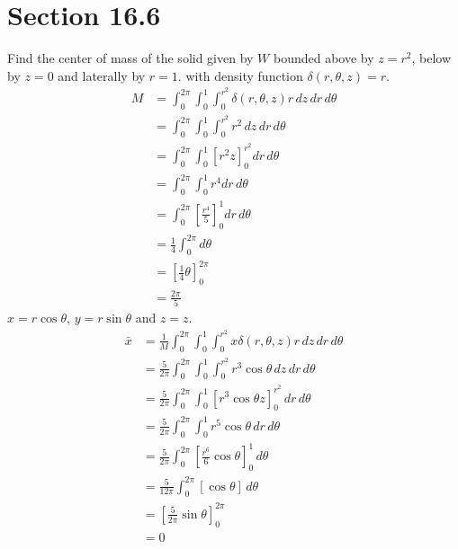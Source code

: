 \documentclass[letter,11pt]{article}
\begin{document}
\section*{Section 16.6}
Find the center of mass of the solid given by $W$ bounded above by $z = r^2$, below by $z = 0$ and laterally by $r = 1$. with density function $\delta(r, \theta, z) = r$.
\begin{align*}
    M&= \int_{0}^{2\pi}\int_{0}^{1}\int_{0}^{r^{2}}\delta(r, \theta, z) r \, dz\, dr\, d\theta\\
    &= \int_{0}^{2\pi}\int_{0}^{1}\int_{0}^{r^{2}} r^2 \, dz\, dr\, d\theta\\
    &= \int_{0}^{2\pi}\int_{0}^{1} \left[r^2z\right]_{0}^{r^2}dr\, d\theta \\
    &= \int_{0}^{2\pi}\int_{0}^{1} r^4 dr\, d\theta \\
    &= \int_{0}^{2\pi}\left[\frac{r^4}{5}\right]_{0}^{1} dr\, d\theta \\
    &= \frac{1}{4}\int_{0}^{2\pi}d\theta \\
    &= \left[\frac{1}{4}\theta\right]_{0}^{2\pi} \\
    &= \frac{2\pi}{5}
\end{align*}
$x=r\cos\theta$, $y=r\sin\theta$ and $z=z$.
\begin{align*}
\bar{x} &= \frac{1}{M}\int_{0}^{2\pi}\int_{0}^{1}\int_{0}^{r^{2}} x\delta(r, \theta, z) r \, dz\, dr\, d\theta \\
        &= \frac{5}{2\pi}\int_{0}^{2\pi}\int_{0}^{1}\int_{0}^{r^{2}} r^3\cos\theta \, dz\, dr\, d\theta \\
        &= \frac{5}{2\pi}\int_{0}^{2\pi}\int_{0}^{1} \left[r^3\cos\theta z\right]_{0}^{r^{2}} \, dr\, d\theta \\
        &= \frac{5}{2\pi}\int_{0}^{2\pi}\int_{0}^{1} r^5\cos\theta \, dr\, d\theta \\
        &= \frac{5}{2\pi}\int_{0}^{2\pi} \left[\frac{r^6}{6}\cos\theta \right]_{0}^{1}\, d\theta \\
        &= \frac{5}{12\pi}\int_{0}^{2\pi} \left[\cos\theta \right]\, d\theta \\
        &= \left[\frac{5}{2\pi} \sin\theta \right]_{0}^{2\pi} \\
        &= 0 \\
\end{align*}
\end{document}
